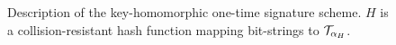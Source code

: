 \begin{figure}
\centering
\begin{pcvstack}
\begin{pchstack}[center]
  \pchspace
  \pchspace
  \end{pchstack}
  \pchspace
  \begin{pchstack}
  \begin{pcvstack}
  \pcvspace
  \end{pcvstack}
  \pchspace
\end{pchstack}
\end{pcvstack}
\caption{Description of the key-homomorphic one-time signature scheme. $H$ is a collision-resistant hash function mapping bit-strings to $\mathcal{T}_{\alpha_H}$.}
\label{fig:otsconstruction}
\end{figure}

